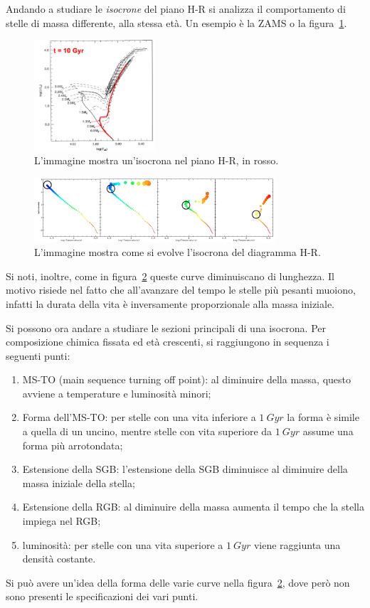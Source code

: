 Andando a studiare le \emph{isocrone} del piano H-R si analizza il comportamento di stelle di massa differente, alla stessa età. Un esempio è la ZAMS o la figura~\ref{fig:isocrona}.

\begin{figure}
    \centering
    \includegraphics[width = 0.4\textwidth]{immagini/HR-isocrona.png}
    \caption{L'immagine mostra un'isocrona nel piano H-R, in rosso.}\label{fig:isocrona}
\end{figure}
\begin{figure}
    \centering
    \includegraphics[width = 0.8\textwidth]{immagini/evoluzione-isocrona.png}
    \caption{L'immagine mostra come si evolve l'isocrona del diagramma H-R.}\label{fig:evoluzione-isocrona}
\end{figure}

Si noti, inoltre, come in figura~\ref{fig:evoluzione-isocrona} queste curve diminuiscano di lunghezza. Il motivo risiede nel fatto che all'avanzare del tempo le stelle più pesanti muoiono, infatti la durata della vita è inversamente proporzionale alla massa iniziale.

Si possono ora andare a studiare le sezioni principali di una isocrona. Per composizione chimica fissata ed età crescenti, si raggiungono in sequenza i seguenti punti:

\begin{enumerate}
    \item MS-TO (main sequence turning off point): al diminuire della massa, questo avviene a temperature e luminosità minori;
    \item Forma dell'MS-TO: per stelle con una vita inferiore a $\SI{1}{Gyr}$ la forma è simile a quella di un uncino, mentre stelle con vita superiore da $\SI{1}{Gyr}$ assume una forma più arrotondata;
    \item Estensione della SGB: l'estensione della SGB diminuisce al diminuire della massa iniziale della stella;
    \item Estensione della RGB: al diminuire della massa aumenta il tempo che la stella impiega nel RGB;
    \item luminosità: per stelle con una vita superiore a $\SI{1}{Gyr}$ viene raggiunta una densità costante.
\end{enumerate}
Si può avere un'idea della forma delle varie curve nella figura~\ref{fig:evoluzione-isocrona}, dove però non sono presenti le specificazioni dei vari punti.
